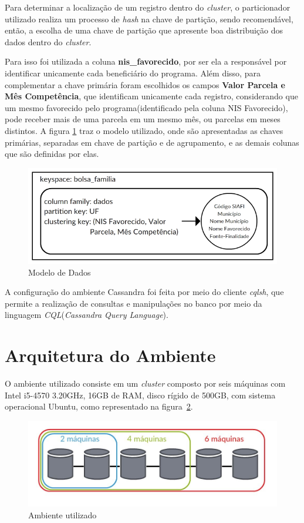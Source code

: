 Para determinar a localização de um registro dentro do \emph{cluster}, o particionador utilizado realiza um processo de \emph{hash} na chave de partição, sendo recomendável, então, a escolha de uma chave de partição que apresente boa distribuição dos dados dentro do \emph{cluster}. 

Para isso foi utilizada a coluna \textbf{nis\_favorecido}, por ser ela a responsável por identificar unicamente cada beneficiário do programa. Além disso, para complementar a chave primária foram escolhidos os campos \textbf{Valor Parcela e Mês Competência}, que identificam unicamente cada registro, considerando que um mesmo favorecido pelo programa(identificado pela coluna NIS Favorecido), pode receber mais de uma parcela em um mesmo mês, ou parcelas em meses distintos. A figura \ref{fig:modelocassandra} traz o modelo utilizado, onde são apresentadas as chaves primárias, separadas em chave de partição e de agrupamento, e as demais colunas que são definidas por elas.

\begin{figure}[!htb]
	\centering
	\includegraphics[width=1\textwidth]{figuras/modelocassandra.png}
	\caption{Modelo de Dados}
	\label{fig:modelocassandra}
\end{figure}

A configuração do ambiente Cassandra foi feita por meio do cliente \emph{cqlsh}, que permite a realização de consultas e manipulações no banco por meio da linguagem \emph{CQL}(\emph{Cassandra Query Language}).

\section{Arquitetura do Ambiente}
O ambiente utilizado consiste em um \emph{cluster} composto por seis máquinas com Intel i5-4570 3.20GHz, 16GB de RAM, disco rígido de 500GB, com sistema operacional Ubuntu, como representado na figura~\ref{fig:ambiente}.

\begin{figure}[!htb]
	\centering
	\includegraphics[width=1\textwidth]{figuras/ambiente.jpg}
	\caption{Ambiente utilizado}
	\label{fig:ambiente}
\end{figure}


